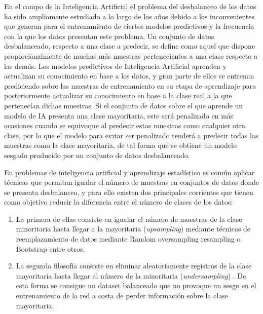 \documentclass{uathesis-es}
\begin{document}

En el campo de la Inteligencia Artificial el problema del desbalanceo de los datos ha sido ampliamente estudiado a lo largo de los años debido a los inconvenientes que generan para el entrenamiento de ciertos modelos predictivos y la frecuencia con la que los datos presentan este problema. Un conjunto de datos desbalanceado, respecto a una clase a predecir, se define como aquel que dispone proporcionalmente de muchas más muestras pertenecientes a una clase respecto a las demás. Los modelos predictivos de Inteligencia Artificial aprenden y actualizan su conocimiento en base a los datos, y gran parte de ellos se entrenan prediciendo sobre las muestras de entrenamiento en su etapa de aprendizaje para posteriormente actualizar su conocimiento en base a la clase real a la que pertenecían dichas muestras. Si el conjunto de datos sobre el que aprende un modelo de IA presenta una clase mayoritaria, este será penalizado en más ocasiones cuando se equivoque al predecir estas muestras como cualquier otra clase, por lo que el modelo para evitar ser penalizado tenderá a predecir todas las muestras como la clase mayoritaria, de tal forma que se obtiene un modelo sesgado producido por un conjunto de datos desbalanceado.

En problemas de inteligencia artificial y aprendizaje estadístico es común aplicar técnicas que permitan igualar el número de muestras en conjuntos de datos donde se presenta desbalanceo, y para ello existen dos principales corrientes que tienen como objetivo reducir la diferencia entre el número de clases de los datos:

\begin{enumerate}
    \item La primera de ellas consiste en igualar el número de muestras de la clase minoritaria hasta llegar a la mayoritaria (\textit{upsampling}) mediante técnicas de reemplazamiento de datos mediante Random oversampling resampling \cite{abdi2015combat} o Bootstrap \cite{zoubir2007bootstrap} entre otros.
    \item La segunda filosofía consiste en eliminar aleatoriamente registros de la clase mayoritaria hasta llegar al número de la minoritaria (\textit{undersampling}) \cite{mohammed2020machine}. De esta forma se consigue un dataset balanceado que no provoque un sesgo en el entrenamiento de la red a costa de perder información sobre la clase mayoritaria.
\end{enumerate}
\end{document}
